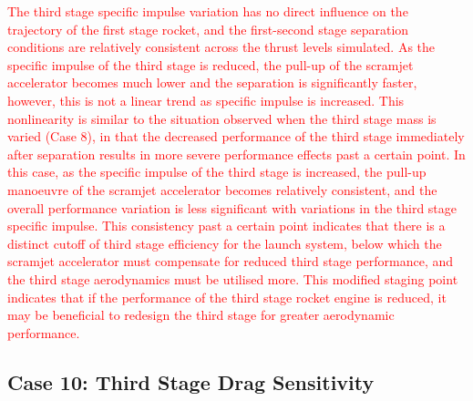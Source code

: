\textcolor{red}{
The third stage specific impulse variation has no direct influence on the trajectory of the first stage rocket, and the first-second stage separation conditions are relatively consistent across the thrust levels simulated.
As the specific impulse of the third stage is reduced, the pull-up of the scramjet accelerator becomes much lower and the separation is significantly faster, however, this is not a linear trend as specific impulse is increased. This nonlinearity is similar to the situation observed when the third stage mass is varied (Case 8), in that the decreased performance of the third stage immediately after separation results in more severe performance effects past a certain point. In this case, as the specific impulse of the third stage is increased, the pull-up manoeuvre of the scramjet accelerator becomes relatively consistent, and the overall performance variation is less significant with variations in the third stage specific impulse. This consistency past a certain point indicates that there is a distinct cutoff of third stage efficiency for the launch system, below which the scramjet accelerator must compensate for reduced third stage performance, and the third stage aerodynamics must be utilised more. This modified staging point indicates that if the performance of the third stage rocket engine is reduced, it may be beneficial to redesign the third stage for greater aerodynamic performance. 
}



\subsection{Case 10: Third Stage Drag Sensitivity}

